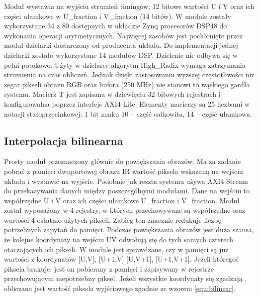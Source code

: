 
Moduł wystawia na wyjściu strumień timingów, 12 bitowe wartości U i V oraz ich części ułamkowe w U\_fraction i V\_fraction (14 bitów). %
W module zostały wykorzystane 34 z 80 dostępnych w układzie Zynq procesorów DSP48 do wykonania operacji arytmetycznych. %
Najwięcej zasobów jest pochłonięte przez moduł dzielarki dostarczony od producenta układu. %
Do implementacji jednej dzielarki zostało wykorzystane 14 modułów DSP. %
Dzielenie nie odbywa się w pełni potokowo. 
Użyty w dzielarce algorytm High\_Radix wymaga zatrzymania strumienia na czas obliczeń. 
Jednak dzięki zastosowaniu wyższej częstotliwości niż zegar pikseli obrazu RGB oraz bufora (250 MHz) nie stanowi to wąskiego gardła systemu. %
Macierz T jest zapisana  w dziewięciu 32 bitowych rejestrach i konfigurowalna poprzez interfejs AXI4-Lite. 
Elementy macierzy są 25 liczbami w notacji stałoprzecinkowej: 1 bit znaku 10 – część całkowita, 14 – część ułamkowa.




\subsection{Interpolacja bilinearna} %

Prosty moduł przeznaczony głównie do powiększania obrazów. %
Ma za zadanie pobrać z pamięci dwuportowej obrazu IR wartość piksela wskazaną na wejściu układu i wystawić na wyjście. %
Podobnie jak reszta systemu używa AXI4-Stream do przekazywania danych między poszczególnymi modułami. 
Dane na wejściu to współrzędne U i V oraz ich części ułamkowe U\_fraction i V\_fraction. 
Moduł został wyposażony w 4 rejestry, w których przechowywane są współrzędne oraz wartości 4 ostatnio użytych pikseli. 
Zabieg ten znacznie redukuje liczbę potrzebnych zapytań do pamięci. 
Podczas powiększania obrazów jest duża szansa, że kolejne koordynaty na wejściu UV odwołują się do tych samych czterech otaczających ich pikseli. 
W module jest sprawdzane, czy w pamięci są już wartości z koordynatów [U,V], [U+1,V] [U,V+1], [U+1,V+1]. 
Jeżeli któregoś piksela brakuje, jest on pobierany z pamięci i zapisywany w rejestrze przechowującym niepotrzebny piksel. 
Jeżeli wszystkie koordynaty się zgadzają , obliczana jest wartość piksela wyjściowego zgodnie ze wzorem \eqref{equ:bilinear}.  

